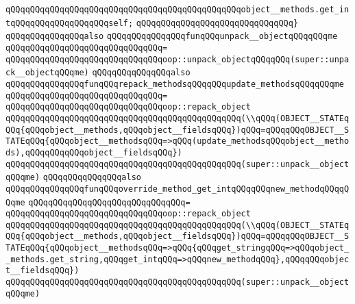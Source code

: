 \verb|qQQqqQQqqQQqqQQqqQQqqQQqqQQqqQQqqQQqqQQqqQQqqQQqobject__methods.get_intqQQqqQQqqQQqqQQqqQQqself;|\newline
\verb|qQQqqQQqqQQqqQQqqQQqqQQqqQQqqQQq}|\newline
\newline
\verb|qQQqqQQqqQQqqQQqalso|\newline
\verb|qQQqqQQqqQQqqQQqfunqQQqunpack__objectqQQqqQQqme|\newline
\verb|qQQqqQQqqQQqqQQqqQQqqQQqqQQqqQQq=|\newline
\verb|qQQqqQQqqQQqqQQqqQQqqQQqqQQqqQQqoop::unpack_objectqQQqqQQq(super::unpack__objectqQQqme)|\newline
\newline
\verb|qQQqqQQqqQQqqQQqalso|\newline
\verb|qQQqqQQqqQQqqQQqfunqQQqrepack_methodsqQQqqQQqupdate_methodsqQQqqQQqme|\newline
\verb|qQQqqQQqqQQqqQQqqQQqqQQqqQQqqQQq=|\newline
\verb|qQQqqQQqqQQqqQQqqQQqqQQqqQQqqQQqoop::repack_object|\newline
\verb|qQQqqQQqqQQqqQQqqQQqqQQqqQQqqQQqqQQqqQQqqQQqqQQq(\\qQQq(OBJECT__STATEqQQq{qQQqobject__methods,qQQqobject__fieldsqQQq})qQQq=qQQqqQQqOBJECT__STATEqQQq{qQQqobject__methodsqQQq=>qQQq(update_methodsqQQqobject__methods),qQQqqQQqqQQqobject__fieldsqQQq})|\newline
\verb|qQQqqQQqqQQqqQQqqQQqqQQqqQQqqQQqqQQqqQQqqQQqqQQq(super::unpack__objectqQQqme)|\newline
\newline
\verb|qQQqqQQqqQQqqQQqalso|\newline
\verb|qQQqqQQqqQQqqQQqfunqQQqoverride_method_get_intqQQqqQQqnew_methodqQQqqQQqme|\newline
\verb|qQQqqQQqqQQqqQQqqQQqqQQqqQQqqQQq=|\newline
\verb|qQQqqQQqqQQqqQQqqQQqqQQqqQQqqQQqoop::repack_object|\newline
\verb|qQQqqQQqqQQqqQQqqQQqqQQqqQQqqQQqqQQqqQQqqQQqqQQq(\\qQQq(OBJECT__STATEqQQq{qQQqobject__methods,qQQqobject__fieldsqQQq})qQQq=qQQqqQQqOBJECT__STATEqQQq{qQQqobject__methodsqQQq=>qQQq{qQQqget_stringqQQq=>qQQqobject__methods.get_string,qQQqget_intqQQq=>qQQqnew_methodqQQq},qQQqqQQqobject__fieldsqQQq})|\newline
\verb|qQQqqQQqqQQqqQQqqQQqqQQqqQQqqQQqqQQqqQQqqQQqqQQq(super::unpack__objectqQQqme)|\newline
\newline
